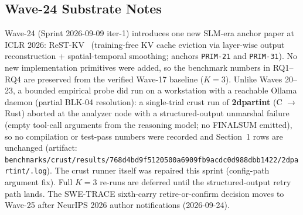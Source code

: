 \subsection{Wave-24 Substrate Notes}
\label{sec:eval_wave24}

Wave-24 (Sprint 2026-09-09 iter-1) introduces one new SLM-era anchor paper at ICLR 2026: ReST-KV~\cite{p157_an_restkv_2026} (training-free KV cache eviction via layer-wise output reconstruction + spatial-temporal smoothing; anchors \texttt{PRIM-21} and \texttt{PRIM-31}). No new implementation primitives were added, so the benchmark numbers in RQ1--RQ4 are preserved from the verified Wave-17 baseline ($K=3$). Unlike Waves 20--23, a bounded empirical probe did run on a workstation with a reachable Ollama daemon (partial BLK-04 resolution): a single-trial crust run of \textbf{2dpartint} (C $\to$ Rust) aborted at the analyzer node with a structured-output unmarshal failure (empty tool-call arguments from the reasoning model; no FINALSUM emitted), so no compilation or test-pass numbers were recorded and Section~1 rows are unchanged (artifact: \texttt{benchmarks/crust/results/768d4bd9f5120500a6909fb9acdc0d988dbb1422/2dpartint/.log}). The crust runner itself was repaired this sprint (config-path argument fix). Full $K=3$ re-runs are deferred until the structured-output retry path lands. The SWE-TRACE sixth-carry retire-or-confirm decision moves to Wave-25 after NeurIPS 2026 author notifications (2026-09-24).
